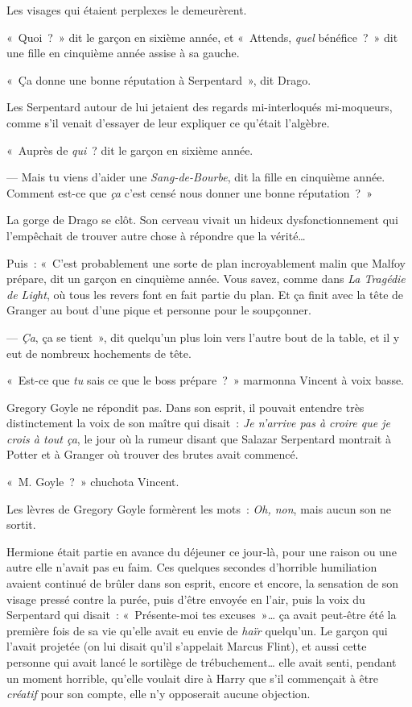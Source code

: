 Les visages qui étaient perplexes le demeurèrent.

«~Quoi~?~» dit le garçon en sixième année, et «~Attends, \emph{quel} bénéfice~?~» dit une fille en cinquième année assise à sa gauche.

«~Ça donne une bonne réputation à Serpentard~», dit Drago.

Les Serpentard autour de lui jetaient des regards mi-interloqués mi-moqueurs, comme s'il venait d'essayer de leur expliquer ce qu'était l'algèbre.

«~Auprès de \emph{qui}~? dit le garçon en sixième année.

--- Mais tu viens d'aider une \emph{Sang-de-Bourbe}, dit la fille en cinquième année. Comment est-ce que \emph{ça} c'est censé nous donner une bonne réputation~?~»

La gorge de Drago se clôt. Son cerveau vivait un hideux dysfonctionnement qui l'empêchait de trouver autre chose à répondre que la vérité…

Puis~: «~C'est probablement une sorte de plan incroyablement malin que Malfoy prépare, dit un garçon en cinquième année. Vous savez, comme dans \emph{La Tragédie de Light}, où tous les revers font en fait partie du plan. Et ça finit avec la tête de Granger au bout d'une pique et personne pour le soupçonner.

--- \emph{Ça}, ça se tient~», dit quelqu'un plus loin vers l'autre bout de la table, et il y eut de nombreux hochements de tête.

\later

«~Est-ce que \emph{tu} sais ce que le boss prépare~?~» marmonna Vincent à voix basse.

Gregory Goyle ne répondit pas. Dans son esprit, il pouvait entendre très distinctement la voix de son maître qui disait~: \emph{Je n'arrive pas à croire que je crois à tout ça}, le jour où la rumeur disant que Salazar Serpentard montrait à Potter et à Granger où trouver des brutes avait commencé.

«~M. Goyle~?~» chuchota Vincent.

Les lèvres de Gregory Goyle formèrent les mots~: \emph{Oh, non}, mais aucun son ne sortit.

\later

Hermione était partie en avance du déjeuner ce jour-là, pour une raison ou une autre elle n'avait pas eu faim. Ces quelques secondes d'horrible humiliation avaient continué de brûler dans son esprit, encore et encore, la sensation de son visage pressé contre la purée, puis d'être envoyée en l'air, puis la voix du Serpentard qui disait~: «~Présente-moi tes excuses~»… ça avait peut-être été la première fois de sa vie qu'elle avait eu envie de \emph{haïr} quelqu'un. Le garçon qui l'avait projetée (on lui disait qu'il s'appelait Marcus Flint), et aussi cette personne qui avait lancé le sortilège de trébuchement… elle avait senti, pendant un moment horrible, qu'elle voulait dire à Harry que s'il commençait à être \emph{créatif} pour son compte, elle n'y opposerait aucune objection.

